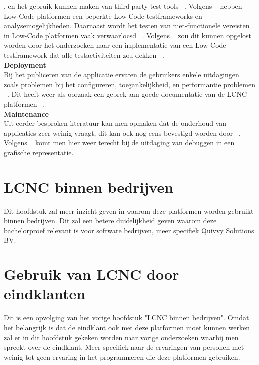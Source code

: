 , en het gebruik kunnen maken van third-party test tools  ~\autocite{Rokis_2022}. Volgens ~\textcite{Rokis_2022} hebben Low-Code platformen een beperkte Low-Code testframeworks en analysemogelijkheden.
Daarnaast wordt het testen van niet-functionele vereisten in Low-Code platformen vaak verwaarloosd ~\autocite{Rokis_2022}.
Volgens ~\textcite{Rokis_2022} zou dit kunnen opgelost worden door het onderzoeken naar een implementatie van een Low-Code testframework dat alle testactiviteiten zou dekken ~\autocite{Rokis_2022}.
\\
\textbf{Deployment}
\\
Bij het publiceren van de applicatie ervaren de gebruikers enkele uitdagingen zoals problemen bij het configureren, toegankelijkheid, en performantie problemen ~\autocite{Rokis_2022}.
Dit heeft weer als oorzaak een gebrek aan goede documentatie van de LCNC platformen ~\autocite{Rokis_2022}.
\\
\textbf{Maintenance}
\\
Uit eerder besproken literatuur kan men opmaken dat de onderhoud van applicaties zeer weinig vraagt, dit kan ook nog eens bevestigd worden door ~\textcite{Rokis_2022}.
Volgens ~\textcite{Rokis_2022} komt men hier weer terecht bij de uitdaging van debuggen in een grafische representatie.


\section{LCNC binnen bedrijven}
\label{sec:lcnc-bedrijven}
Dit hoofdstuk zal meer inzicht geven in waarom deze platformen worden gebruikt binnen bedrijven. Dit zal een betere duidelijkheid geven
waarom deze bachelorproef relevant is voor software bedrijven, meer specifiek Quivvy Solutions BV.

\section{Gebruik van LCNC door eindklanten}
\label{sec:lcnc-eindklanten}
Dit is een opvolging van het vorige hoofdstuk "LCNC binnen bedrijven". Omdat het belangrijk is dat de eindklant ook met deze platformen moet kunnen werken
zal er in dit hoofdstuk gekeken worden naar vorige onderzoeken waarbij men spreekt over de eindklant. 
Meer specifiek naar de ervaringen van personen met weinig tot geen ervaring in het programmeren die deze platformen gebruiken.



